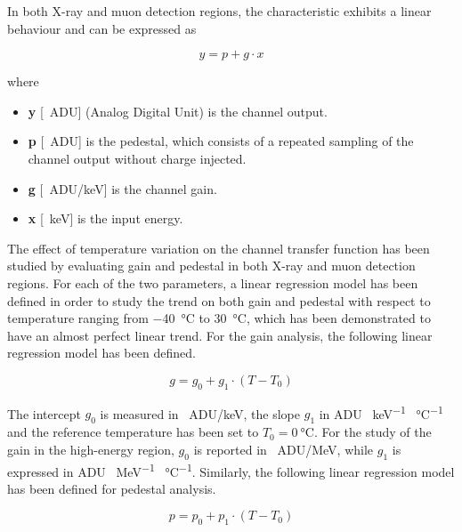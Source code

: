 \noindent
In both X-ray and muon detection regions, the characteristic exhibits a linear behaviour and can be expressed as

\begin{equation}
    y = p + g \cdot x
    \label{FDTlinearModel}
\end{equation}

\noindent
where

\begin{itemize}
    \itemsep0em
    \item \textbf{y} [\SI{}{ADU}] (Analog Digital Unit) is the channel output.
    \item \textbf{p} [\SI{}{ADU}] is the pedestal, which consists of a repeated sampling of the channel output without charge injected.
    \item \textbf{g} [\SI{}{ADU/\kilo\electronvolt}] is the channel gain.
    \item \textbf{x} [\SI{}{\kilo\electronvolt}] is the input energy.
\end{itemize}

The effect of temperature variation on the channel transfer function has been studied by evaluating gain and pedestal in both X-ray and muon detection regions. For each of the two parameters, a linear regression model has been defined in order to study the trend on both gain and pedestal with respect to temperature ranging from \SI{-40}{\celsius} to \SI{30}{\celsius}, which has been demonstrated to have an almost perfect linear trend. For the gain analysis, the following linear regression model has been defined.

\begin{equation}
    g = g_{\textit{0}} + g_{\textit{1}} \cdot (T - T_{\textit{0}})
    \label{equationGain}
\end{equation}

\noindent
The intercept $g_{\textit{0}}$ is measured in \SI{}{ADU/\kilo\electronvolt}, the slope $g_{\textit{1}}$ in ADU \SI{}{\kilo\electronvolt^{-1}} \SI{}{\celsius^{-1}} and the reference temperature has been set to $T_{\textit{0}} = \SI{0}{\celsius}$. For the study of the gain in the high-energy region, $g_{0}$ is reported in \SI{}{ADU/\mega\electronvolt}, while $g_{1}$ is expressed in ADU \SI{}{\mega\electronvolt^{-1}} \SI{}{\celsius^{-1}}. Similarly, the following linear regression model has been defined for pedestal analysis.

\begin{equation}
    p = p_{\textit{0}} + p_{\textit{1}} \cdot (T - T_{\textit{0}})
\end{equation}

